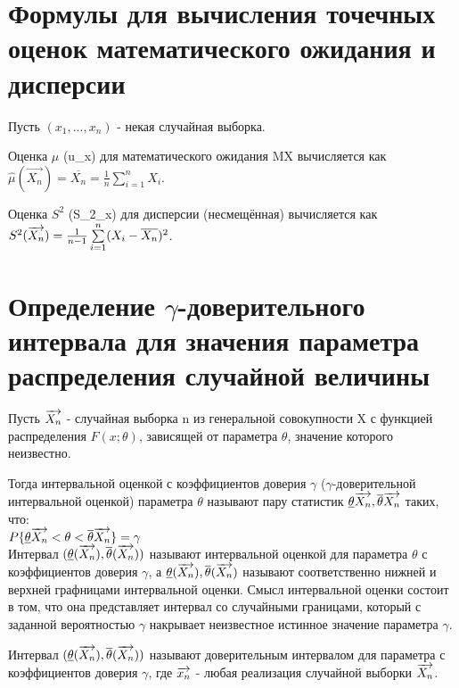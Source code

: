 \section{Формулы для вычисления точечных оценок математического ожидания и дисперсии}
Пусть $(x_{1}, ..., x_{n})$ - некая случайная выборка.

Оценка $\hat{\mu}$ (u\_x) для математического ожидания MX вычисляется как $\hat{\mu}(\overrightarrow{X_{n}}) = \overline{X_{n}} = \frac{1}{n}\sum\limits_{i=1}^{n} X_{i}$.

Оценка $S^{2}$ (S\_2\_x) для дисперсии (несмещённая) вычисляется как $S^{2}(\overrightarrow{X_{n}}) = \frac{1}{n - 1}\sum\limits_{i=1}^{n}(X_{i} - \overline{X_{n}})^{2}$.

\section{Определение $\gamma$-доверительного интервала для значения параметра распределения случайной величины}
Пусть $\overrightarrow{X_{n}}$ - случайная выборка n из генеральной совокупности X с функцией распределения $F(x;\theta)$, зависящей от параметра $\theta$, значение которого неизвестно.

Тогда интервальной оценкой с коэффициентов доверия $\gamma$ ($\gamma$-доверительной интервальной оценкой) параметра $\theta$ называют пару статистик $\underline{\theta}\overrightarrow{X_{n}}, \overline{\theta}\overrightarrow{X_{n}}$ таких, что:\\
$P\{\underline{\theta}\overrightarrow{X_{n}} < \theta < \overline{\theta}\overrightarrow{X_{n}}\} = \gamma$\\

Интервал $(\underline{\theta}(\overrightarrow{X_{n}}), \overline{\theta}(\overrightarrow{X_{n}}))$ называют интервальной оценкой для параметра $\theta$ с коэффициентов доверия $\gamma$, а $\underline{\theta}(\overrightarrow{X_{n}}), \overline{\theta}(\overrightarrow{X_{n}})$ называют соответственно нижней и верхней графницами интервальной оценки. Смысл интервальной оценки состоит в том, что она представляет интервал со случайными границами, который с заданной вероятностью $\gamma$ накрывает неизвестное истинное значение параметра $\gamma$.

Интервал $(\underline{\theta}(\overrightarrow{X_{n}}), \overline{\theta}(\overrightarrow{X_{n}}))$ называют доверительным интервалом для параметра с коэффициентов доверия $\gamma$, где $\overrightarrow{x_{n}}$ - любая реализация случайной выборки $\overrightarrow{X_{n}}$.


